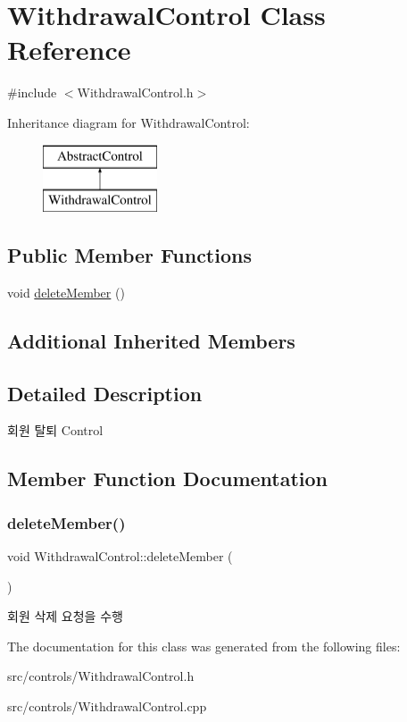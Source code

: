 \hypertarget{class_withdrawal_control}{}\section{Withdrawal\+Control Class Reference}
\label{class_withdrawal_control}


{\ttfamily \#include $<$Withdrawal\+Control.\+h$>$}

Inheritance diagram for Withdrawal\+Control\+:\begin{figure}[H]
\begin{center}
\leavevmode
\includegraphics[height=2.000000cm]{class_withdrawal_control}
\end{center}
\end{figure}
\subsection*{Public Member Functions}
\begin{DoxyCompactItemize}
\item 
void \mbox{\hyperlink{class_withdrawal_control_a9bbb9752138ece8a770211cd4d1be5b9}{delete\+Member}} ()
\end{DoxyCompactItemize}
\subsection*{Additional Inherited Members}


\subsection{Detailed Description}
회원 탈퇴 Control 

\subsection{Member Function Documentation}
\mbox{\label{class_withdrawal_control_a9bbb9752138ece8a770211cd4d1be5b9}} 
\subsubsection{\texorpdfstring{delete\+Member()}{deleteMember()}}
{\footnotesize\ttfamily void Withdrawal\+Control\+::delete\+Member (\begin{DoxyParamCaption}{ }\end{DoxyParamCaption})}

회원 삭제 요청을 수행 

The documentation for this class was generated from the following files\+:\begin{DoxyCompactItemize}
\item 
src/controls/Withdrawal\+Control.\+h\item 
src/controls/Withdrawal\+Control.\+cpp\end{DoxyCompactItemize}
